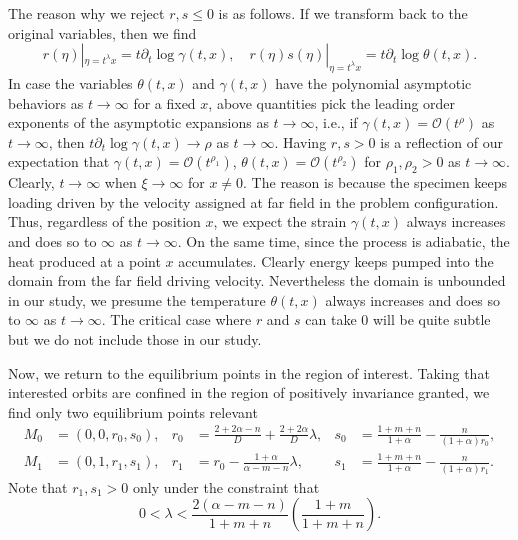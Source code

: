 \documentclass[a4paper,11pt]{article}
\theoremstyle{remark}
\begin{document}
The reason why we reject $r,s\le0$ is as follows. If we transform back to the original variables, then we find
\begin{equation*}
 r(\eta)|_{\eta=t^\lambda x}=t\partial_t\log \gamma(t,x), \quad r(\eta)s(\eta)|_{\eta=t^\lambda x}=t\partial_t \log \theta(t,x).
\end{equation*}
In case the variables $\theta(t,x)$ and $\gamma(t,x)$ have the polynomial asymptotic behaviors as $t \rightarrow \infty$ for a fixed $x$, above quantities pick the leading order exponents of the asymptotic expansions as $t \rightarrow \infty$, i.e., if $\gamma(t,x) = \mathcal{O}(t^\rho)$ as $t \rightarrow \infty$, then $t\partial_t\log \gamma(t,x) \rightarrow \rho$ as $t \rightarrow \infty$. Having $r,s>0$ is a reflection of our expectation that $\gamma(t,x) = \mathcal{O}(t^{\rho_1})$, $\theta(t,x) = \mathcal{O}(t^{\rho_2})$ for $\rho_1,\rho_2 >0$ as $t \rightarrow \infty$. Clearly, $t \rightarrow \infty$ when $\xi \rightarrow \infty$ for $x\ne0$. The reason is because the specimen keeps loading driven by the velocity assigned at far field in the problem configuration. Thus, regardless of the position $x$, we expect the strain $\gamma(t,x)$ always increases and does so to  $\infty$ as $t \rightarrow\infty$. On the same time, since the process is adiabatic, the heat produced at a point $x$ accumulates. Clearly energy keeps pumped into the domain from the far field driving velocity. Nevertheless the domain is unbounded in our study, we presume the temperature $\theta(t,x)$ always increases and does so to  $\infty$ as $t \rightarrow\infty$. The critical case where $r$ and $s$ can take $0$ will be quite subtle but we do not include those in our study.

Now, we return to the equilibrium points in the region of interest.
Taking that interested orbits are confined in the region of positively invariance granted, we find only two equilibrium points relevant
\begin{align*}
 M_0 &= (0,0,r_0,s_0), & r_0 &=\frac{2+2\alpha-n}{D} + \frac{2+2\alpha}{D}\lambda, & s_0&=\frac{1+m+n}{1+\alpha} - \frac{n}{(1+\alpha)r_0},\\
 M_1 &= (0,1,r_1,s_1), & r_1 &= r_0-\frac{1+\alpha}{\alpha-m-n}\lambda, & s_1&=\frac{1+m+n}{1+\alpha} - \frac{n}{(1+\alpha)r_1}.
\end{align*}
Note that $r_1,s_1>0$ only under the constraint that %
\begin{equation} \label{eq:lambda-range}
 0< \lambda < \frac{2(\alpha-m-n)}{1+m+n}\left(\frac{1+m}{1+m+n}\right).
\end{equation}
\end{document}

